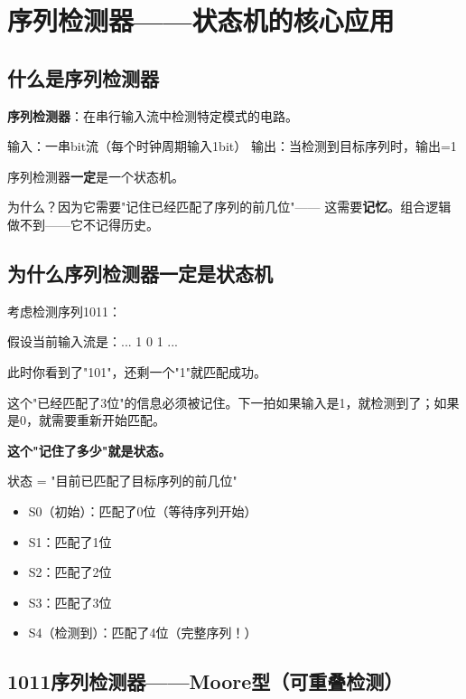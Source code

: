 \chapter{序列检测器——状态机的核心应用}

\section{什么是序列检测器}

\textbf{序列检测器}：在串行输入流中检测特定模式的电路。

输入：一串bit流（每个时钟周期输入1bit）
输出：当检测到目标序列时，输出=1

\begin{keypoint}[序列检测器的本质]
序列检测器\textbf{一定}是一个状态机。

为什么？因为它需要"记住已经匹配了序列的前几位"——
这需要\textbf{记忆}。组合逻辑做不到——它不记得历史。
\end{keypoint}

\section{为什么序列检测器一定是状态机}

考虑检测序列1011：

假设当前输入流是：... 1 0 1 ...

此时你看到了"101"，还剩一个"1"就匹配成功。

这个"已经匹配了3位"的信息必须被记住。下一拍如果输入是1，就检测到了；如果是0，就需要重新开始匹配。

\textbf{这个"记住了多少"就是状态。}

\begin{keypoint}[状态在序列检测器中的含义]
状态 = "目前已匹配了目标序列的前几位"

\begin{itemize}
  \item S0（初始）：匹配了0位（等待序列开始）
  \item S1：匹配了1位
  \item S2：匹配了2位
  \item S3：匹配了3位
  \item S4（检测到）：匹配了4位（完整序列！）
\end{itemize}
\end{keypoint}

\section{1011序列检测器——Moore型（可重叠检测）}

